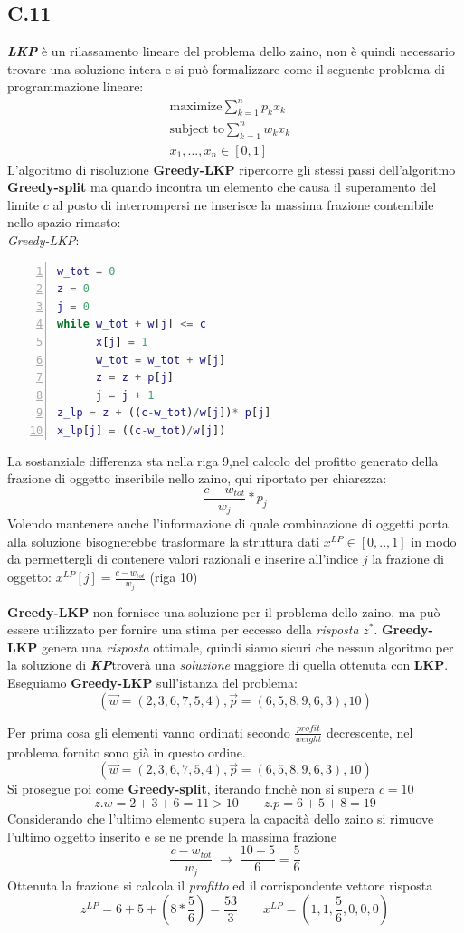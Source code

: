 \documentclass[a4paper]{article}
\newcommand{\imp}[1]{\textbf{\textit{#1}}}
\begin{document}
\subsection{C.11}
\imp{LKP} è un rilassamento lineare del problema dello zaino, non è quindi necessario trovare una soluzione intera e si può formalizzare come il seguente problema di programmazione lineare:
\begin{align*}
	\text{maximize} \sum_{k=1}^n p_kx_k&\\
	\text{subject to} \sum_{k=1}^n w_kx_k&\\
	x_1,...,x_n \in [0,1]&
\end{align*}
L'algoritmo di risoluzione \textbf{Greedy-LKP} ripercorre gli stessi passi dell'algoritmo \textbf{Greedy-split} ma quando incontra un elemento che causa il superamento del limite $c$ al posto di interrompersi ne inserisce la massima frazione contenibile nello spazio rimasto:\\
\textit{Greedy-LKP}:
\begin{lstlisting}[numbers=left,firstnumber=1,language=Matlab, stepnumber=1, xleftmargin=15pt]
w_tot = 0
z = 0
j = 0
while w_tot + w[j] <= c
      x[j] = 1
      w_tot = w_tot + w[j]
      z = z + p[j]
      j = j + 1
z_lp = z + ((c-w_tot)/w[j])* p[j]  
x_lp[j] = ((c-w_tot)/w[j]) 
\end{lstlisting}
La sostanziale differenza sta nella riga 9,nel calcolo del profitto generato della frazione di oggetto inseribile nello zaino, qui riportato per chiarezza: $$\frac{c - w_{tot}}{w_j}*p_j$$
Volendo mantenere anche l'informazione di quale combinazione di oggetti porta alla soluzione bisognerebbe trasformare la struttura dati $x^{LP} \in [0,..,1]$ in modo da permettergli di contenere valori razionali e inserire all'indice $j$ la frazione di oggetto: $x^{LP}[j]=\frac{c - w_{tot}}{w_j}$ (riga 10)

\textbf{Greedy-LKP} non fornisce una soluzione per il problema dello zaino, ma può essere utilizzato per fornire una stima per eccesso della \emph{risposta} $z^*$.
\textbf{Greedy-LKP} genera una \emph{risposta} ottimale, quindi siamo sicuri che nessun algoritmo per la soluzione di \imp{KP}troverà una \textit{soluzione} maggiore di quella ottenuta con \textbf{LKP}. %
Eseguiamo \textbf{Greedy-LKP} sull'istanza del problema: $$(\vec w = (2, 3, 6, 7, 5, 4), \vec p = (6, 5, 8, 9, 6, 3), 10)$$
\begin{adjustwidth}{.8cm}{0cm}
	Per prima cosa gli elementi vanno ordinati secondo $\frac{profit}{weight}$ decrescente, nel problema fornito sono già in questo ordine. 
	$$(\vec w = (2, 3, 6, 7, 5, 4), \vec p = (6, 5, 8, 9, 6, 3), 10)$$
	Si prosegue poi come \textbf{Greedy-split}, iterando finchè non si supera $c=10$
	$$ z.w = 2 + 3 + 6 = 11 > 10 \qquad z.p= 6 + 5 + 8 = 19$$
	Considerando che l'ultimo elemento supera la capacità dello zaino si rimuove l'ultimo oggetto inserito e se ne prende la massima frazione
	$$ \frac{c - w_{tot}}{w_j} \; \rightarrow \; \frac{10 - 5}{6} = \frac{5}{6}$$
	Ottenuta la frazione si calcola il \textit{profitto} ed il corrispondente vettore risposta
	$$ z^{LP}= 6 + 5 + (8 * \frac{5}{6} ) = \frac{53}{3} \qquad x^{LP} = (1,1,\frac{5}{6},0,0,0) $$
\end{adjustwidth}
\end{document}
